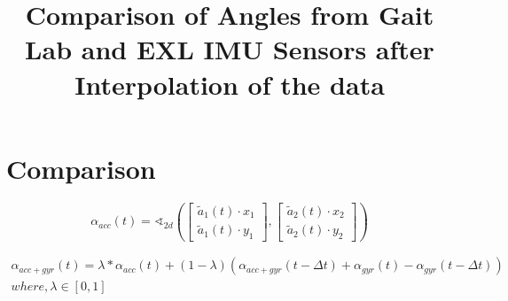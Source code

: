 \documentclass[12pt]{article}
\title{Comparison of Angles from Gait Lab and EXL IMU Sensors after Interpolation of the data}
\author{}
\begin{document}
\maketitle


\section*{Comparison}

\begin{equation}
\alpha_{acc}(t) = \sphericalangle_{2d}
\left(
\begin{bmatrix}
   \tilde{a}_1(t)\cdot x_1\\
 \tilde{a}_1(t)\cdot y_1
\end{bmatrix}
,
\begin{bmatrix}
   \tilde{a}_2(t)\cdot x_2\\
 \tilde{a}_2(t)\cdot y_2
\end{bmatrix}
\right)
\end{equation}

\begin{gather}
\alpha_{acc+gyr}(t) = \lambda * \alpha_{acc}(t) + (1- \lambda)(\alpha_{acc + gyr}(t-{\Delta}t)+\alpha_{gyr}(t)-\alpha_{gyr}(t-{\Delta}t))
\\
where, \lambda \in [0,1]
\end{gather}



{}

\end{document}

